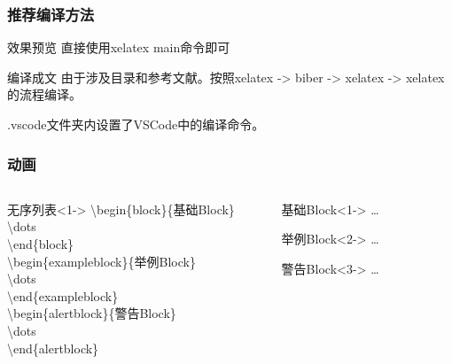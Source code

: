 \begin{frame}
    \frametitle{推荐编译方法}
    \begin{block}{效果预览}
        直接使用xelatex main命令即可
    \end{block}
    \begin{block}{编译成文}
        由于涉及目录和参考文献。按照xelatex -> biber -> xelatex -> xelatex的流程编译。
    \end{block}
    .vscode文件夹内设置了VSCode中的编译命令。
\end{frame}

\begin{frame}
    \frametitle{动画}
    \begin{columns}
        \begin{column}{0.7\textwidth}
            \begin{block}{无序列表}<1->
                \textbackslash begin\{block\}\{基础Block\}<1->\\
                    \quad \textbackslash dots\\
                \textbackslash end\{block\}\\
                \textbackslash begin\{exampleblock\}\{举例Block\}<2->\\
                    \quad \textbackslash dots\\
                \textbackslash end\{exampleblock\}\\
                \textbackslash begin\{alertblock\}\{警告Block\}<3->\\
                    \quad \textbackslash dots\\
                \textbackslash end\{alertblock\}
            \end{block}
        \end{column}
        \begin{column}{0.2\textwidth}
            \begin{block}{基础Block}<1->
                \dots
            \end{block}
            \begin{exampleblock}{举例Block}<2->
                \dots
            \end{exampleblock}
            \begin{alertblock}{警告Block}<3->
                \dots
            \end{alertblock}
        \end{column}
        \begin{column}{0.10\textwidth}
        \end{column}
    \end{columns}
\end{frame}
